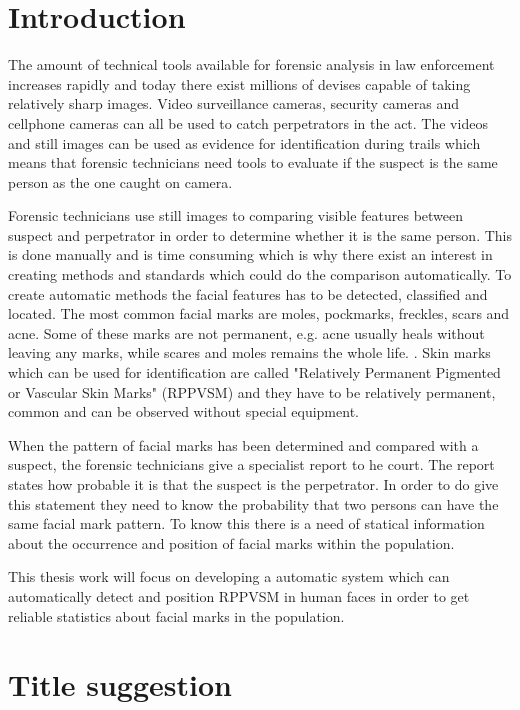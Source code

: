 \documentclass{article}
\begin{document}

\section{Introduction}

The amount of technical tools available for forensic analysis in law enforcement increases rapidly and today there exist millions of devises capable of taking relatively sharp images. Video surveillance cameras, security cameras and cellphone cameras can all be used to catch perpetrators in the act. The videos and still images can be used as evidence for identification during trails which means that forensic technicians need tools to evaluate if the suspect is the same person as the one caught on camera.

Forensic technicians use still images to comparing visible features between suspect and perpetrator in order to determine whether it is the same person. This is done manually and is time consuming which is why there exist an interest in creating methods and standards which could do the comparison automatically. \cite{forensic_identification} To create automatic methods the facial features has to be detected, classified and located. The most common facial marks are moles, pockmarks, freckles, scars and acne. Some of these marks are not permanent, e.g. acne usually heals without leaving any marks, while scares and moles remains the whole life.    \cite{automatic_detector_2015}. Skin marks which can be used for identification are called "Relatively Permanent Pigmented or Vascular Skin Marks" (RPPVSM) and they have to be relatively permanent, common and can be observed without special equipment. \cite{statistic_RPPVSM}

When the pattern of facial marks has been determined and compared with a suspect, the forensic technicians give a specialist report to he court. The report states how probable it is that the suspect is the perpetrator. In order to do give this statement they need to know the probability that two persons can have the same facial mark pattern. To know this there is a need of statical information about the occurrence and position of facial marks within the population. \cite{NFC_stat}

This thesis work will focus on developing a automatic system which can automatically detect and position RPPVSM in human faces in order to get reliable statistics about facial marks in the population.   

\section{Title suggestion}
\end{document}
